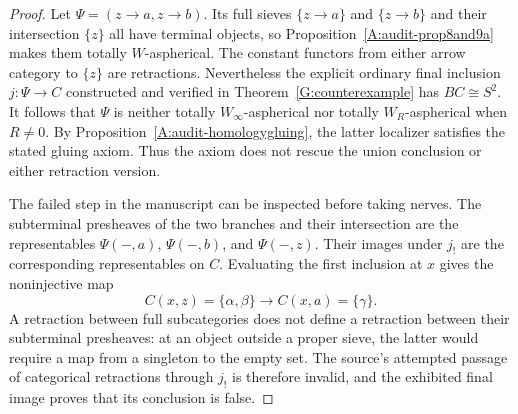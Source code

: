\begin{proof}
Let $\Psi=(z\to a,z\to b)$. Its full sieves $\{z\to a\}$ and $\{z\to b\}$ and their intersection $\{z\}$ all have terminal objects, so Proposition~\ref{A:audit-prop8and9a} makes them totally $W$-aspherical. The constant functors from either arrow category to $\{z\}$ are retractions. Nevertheless the explicit ordinary final inclusion $j:\Psi\to C$ constructed and verified in Theorem~\ref{G:counterexample} has $BC\cong S^2$. It follows that $\Psi$ is neither totally $W_\infty$-aspherical nor totally $W_R$-aspherical when $R\ne0$. By Proposition~\ref{A:audit-homologygluing}, the latter localizer satisfies the stated gluing axiom. Thus the axiom does not rescue the union conclusion or either retraction version.

The failed step in the manuscript can be inspected before taking nerves. The subterminal presheaves of the two branches and their intersection are the representables $\Psi(-,a)$, $\Psi(-,b)$, and $\Psi(-,z)$. Their images under $j_!$ are the corresponding representables on $C$. Evaluating the first inclusion at $x$ gives the noninjective map
\[
 C(x,z)=\{\alpha,\beta\}\longrightarrow
 C(x,a)=\{\gamma\}.
\]
A retraction between full subcategories does not define a retraction between their subterminal presheaves: at an object outside a proper sieve, the latter would require a map from a singleton to the empty set. The source's attempted passage of categorical retractions through $j_!$ is therefore invalid, and the exhibited final image proves that its conclusion is false.
\end{proof}
